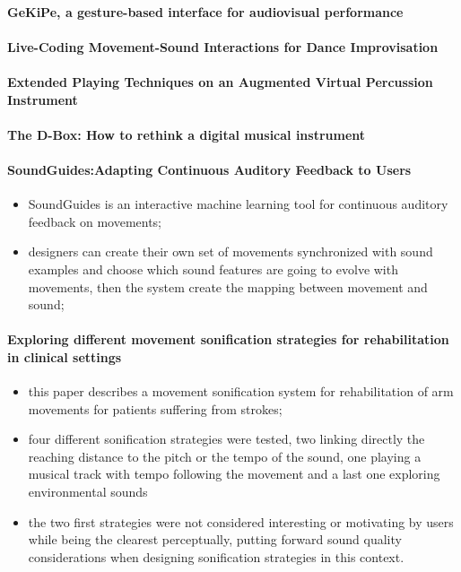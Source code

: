 \documentclass[11pt]{article}
\begin{document}
\paragraph{GeKiPe, a gesture-based interface for audiovisual performance} \citep{fernandez_gekipe_2017} 


\paragraph{Live-Coding Movement-Sound Interactions for Dance Improvisation} \citep{francoise_live-coding_2020}


\paragraph{Extended Playing Techniques on an Augmented Virtual Percussion Instrument} \citep{zappi_extended_2018} 


\paragraph{The D-Box: How to rethink a digital musical instrument} \citep{zappi_d-box_2015} 


\paragraph{SoundGuides:Adapting Continuous Auditory Feedback to Users} \citep{francoise_soundguides_2016} 

\begin{itemize}
    \item SoundGuides is an interactive machine learning tool for continuous auditory feedback on movements;
    \item designers can create their own set of movements synchronized with sound examples and choose which sound features are going to evolve with movements, then the system create the mapping between movement and sound;
\end{itemize}


\paragraph{Exploring different movement sonification strategies for rehabilitation in clinical settings} \citep{bevilacqua_exploring_2018}

\begin{itemize}
    \item this paper describes a movement sonification system for rehabilitation of arm movements for patients suffering from strokes;
    \item four different sonification strategies were tested, two linking directly the reaching distance to the pitch or the tempo of the sound, one playing a musical track with tempo following the movement and a last one exploring environmental sounds
    \item the two first strategies were not considered interesting or motivating by users while being the clearest perceptually, putting forward sound quality considerations when designing sonification strategies in this context.
\end{itemize}
\end{document}
